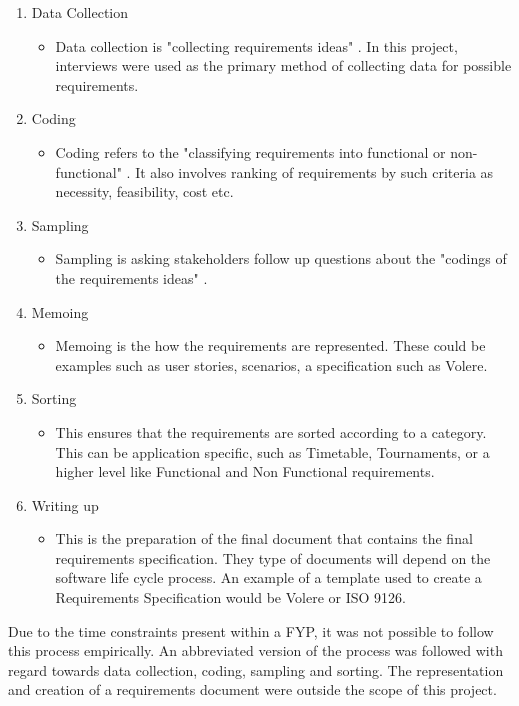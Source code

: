 \begin{enumerate}
\item Data Collection
\begin{itemize}
\item Data collection is "collecting requirements ideas" \parencite{groundedtheory}. In this project, interviews were used as the primary method of collecting data for possible requirements.
\end{itemize}
\item Coding
\begin{itemize}
\item Coding refers to the "classifying requirements into functional or non-functional" \parencite{groundedtheory}. It also involves ranking of requirements by such criteria as necessity, feasibility, cost etc.
\end{itemize}
\item Sampling
\begin{itemize}
\item Sampling is asking stakeholders follow up questions about the "codings of the requirements ideas" \parencite{groundedtheory}.
\end{itemize}
\item Memoing
\begin{itemize}
\item Memoing is the how the requirements are represented. These could be examples such as user stories, scenarios, a specification such as Volere. 
\end{itemize}
\item Sorting
\begin{itemize}
\item This ensures that the requirements are sorted according to a category. This can be application specific, such as Timetable, Tournaments, or a higher level like Functional and Non Functional requirements.
\end{itemize}
\item Writing up
\begin{itemize}
\item This is the preparation of the final document that contains the final requirements specification. They type of documents will depend on the software life cycle process. An example of a template used to create a Requirements Specification would be Volere or ISO 9126.
\end{itemize}
\end{enumerate}

Due to the time constraints present within a FYP, it was not possible to follow this process empirically. An abbreviated version of the process was followed with regard towards data collection, coding, sampling and sorting. The representation and creation of a requirements document were outside the scope of this project.

